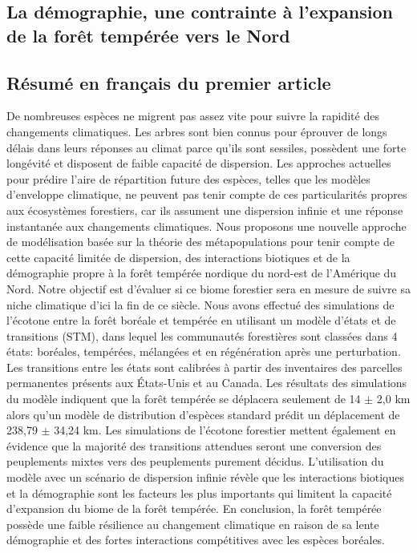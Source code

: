 \begin{spacing}{1.0}
\chapter{La démographie, une contrainte à l'expansion de la forêt tempérée vers le Nord}
\end{spacing}

\section{Résumé en français du premier article}

De nombreuses espèces ne migrent pas assez vite pour suivre la rapidité des changements climatiques.
Les arbres sont bien connus pour éprouver de longs délais dans leurs réponses au climat parce qu'ils
sont sessiles, possèdent une forte longévité et disposent de faible capacité de dispersion. Les
approches actuelles pour prédire l'aire de répartition future des espèces, telles que les modèles
d'enveloppe climatique, ne peuvent pas tenir compte de ces particularités propres aux écosystèmes
forestiers, car ils assument une dispersion infinie et une réponse instantanée aux changements
climatiques. Nous proposons une nouvelle approche de modélisation basée sur la théorie des
métapopulations pour tenir compte de cette capacité limitée de dispersion, des interactions
biotiques et de la démographie propre à la forêt tempérée nordique du nord-est de l'Amérique du
Nord. Notre objectif est d'évaluer si ce biome forestier sera en mesure de suivre sa niche
climatique d'ici la fin de ce siècle. Nous avons effectué des simulations de l'écotone entre la
forêt boréale et tempérée en utilisant un modèle d'états et de transitions (STM), dans lequel les
communautés forestières sont classées dans 4 états: boréales, tempérées, mélangées et en
régénération après une perturbation. Les transitions entre les états sont calibrées à partir des
inventaires des parcelles permanentes présents aux États-Unis et au Canada. Les résultats des
simulations du modèle indiquent que la forêt tempérée se déplacera seulement de 14 $\pm$ 2,0 km
alors qu'un modèle de distribution d'espèces standard prédit un déplacement de 238,79 $\pm$ 34,24
km. Les simulations de l'écotone forestier mettent également en évidence que la majorité des
transitions attendues seront une conversion des peuplements mixtes vers des peuplements purement
décidus. L'utilisation du modèle avec un scénario de dispersion infinie révèle que les interactions
biotiques et la démographie sont les facteurs les plus importants qui limitent la capacité
d'expansion du biome de la forêt tempérée. En conclusion, la forêt tempérée possède une faible
résilience au changement climatique en raison de sa lente démographie et des fortes interactions
compétitives avec les espèces boréales.

